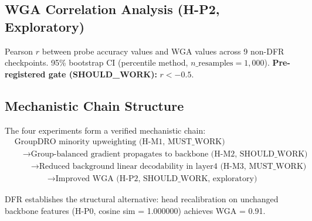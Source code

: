 \subsection{WGA Correlation Analysis (H-P2, Exploratory)}

Pearson $r$ between probe accuracy values and WGA values \cite{izmailov2022feature} across 9 non-DFR checkpoints. 95\% bootstrap CI (percentile method, $n\_\text{resamples}=1{,}000$). \textbf{Pre-registered gate (SHOULD\_WORK):} $r < -0.5$.

\subsection{Mechanistic Chain Structure}

The four experiments form a verified mechanistic chain:
\begin{align*}
&\text{GroupDRO minority upweighting (H-M1, MUST\_WORK)} \\
&\quad\to \text{Group-balanced gradient propagates to backbone (H-M2, SHOULD\_WORK)} \\
&\qquad\to \text{Reduced background linear decodability in layer4 (H-M3, MUST\_WORK)} \\
&\qquad\qquad\to \text{Improved WGA (H-P2, SHOULD\_WORK, exploratory)}
\end{align*}

DFR establishes the structural alternative: head recalibration on unchanged backbone features (H-P0, cosine sim = 1.000000) achieves WGA = 0.91.
